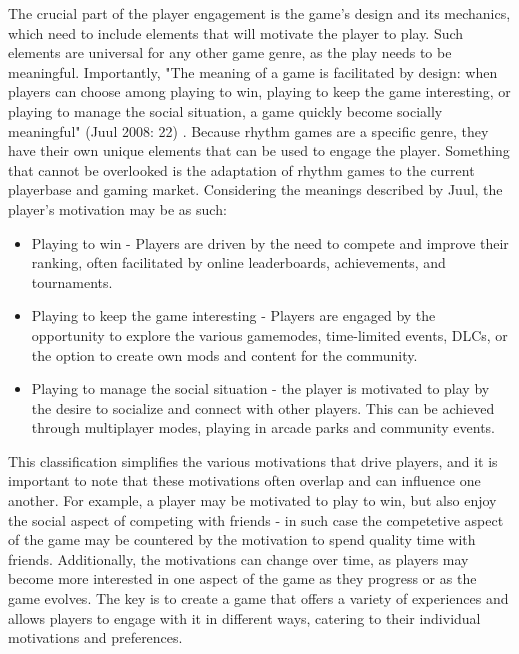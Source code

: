The crucial part of the player engagement is the game's design and its mechanics, which need to include elements that will motivate the player to play. Such elements are universal for any other game genre, as the play needs to be meaningful. Importantly, "The meaning of a game is facilitated by design: when players can choose among playing to win, playing to keep the game interesting, or playing to manage the social situation, a game quickly become socially meaningful" (Juul 2008: 22) \cite{casualrevolution}. Because rhythm games are a specific genre, they have their own unique elements that can be used to engage the player. Something that cannot be overlooked is the adaptation of rhythm games to the current playerbase and gaming market. Considering the meanings described by Juul, the player's motivation may be as such:
\begin{itemize}
\item Playing to win - Players are driven by the need to compete and improve their ranking, often facilitated by online leaderboards, achievements, and tournaments.
\item Playing to keep the game interesting - Players are engaged by the opportunity to explore the various gamemodes, time-limited events, DLCs, or the option to create own mods and content for the community.
\item Playing to manage the social situation - the player is motivated to play by the desire to socialize and connect with other players. This can be achieved through multiplayer modes, playing in arcade parks and community events.
\end{itemize}
This classification simplifies the various motivations that drive players, and it is important to note that these motivations often overlap and can influence one another. For example, a player may be motivated to play to win, but also enjoy the social aspect of competing with friends - in such case the competetive aspect of the game may be countered by the motivation to spend quality time with friends. Additionally, the motivations can change over time, as players may become more interested in one aspect of the game as they progress or as the game evolves. The key is to create a game that offers a variety of experiences and allows players to engage with it in different ways, catering to their individual motivations and preferences.

